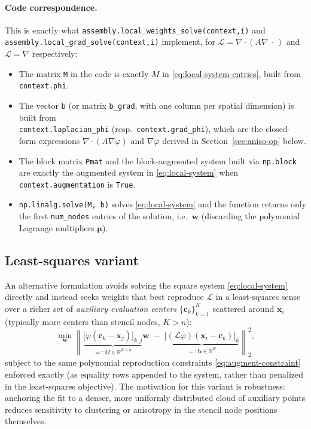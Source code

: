 \documentclass[11pt]{article}
\newcommand{\bx}{\mathbf{x}}
\newcommand{\bw}{\mathbf{w}}
\newcommand{\bc}{\mathbf{c}}
\newcommand{\R}{\mathbb{R}}
\newcommand{\diver}{\nabla\!\cdot}
\newcommand{\grad}{\nabla}
\begin{document}
\paragraph{Code correspondence.}
This is exactly what \texttt{assembly.local\_weights\_solve(context,i)}
and \texttt{assembly.local\_grad\_solve(context,i)} implement, for
$\mathcal{L} = \diver(A\grad\,\cdot\,)$ and $\mathcal{L} = \grad$
respectively:
\begin{itemize}[leftmargin=2em]
  \item The matrix \texttt{M} in the code is exactly $M$ in
        \eqref{eq:local-system-entries}, built from
        \texttt{context.phi}.
  \item The vector \texttt{b} (or matrix \texttt{b\_grad}, with one
        column per spatial dimension) is built from \\
        \texttt{context.laplacian\_phi} (resp.\ \texttt{context.grad\_phi}),
        which are the closed-form expressions $\diver(A\grad\varphi)$
        and $\grad\varphi$ derived in Section~\ref{sec:aniso-op} below.
  \item The block matrix \texttt{Pmat} and the block-augmented system
        built via \texttt{np.block} are exactly the augmented system
        in \eqref{eq:local-system} when \texttt{context.augmentation}
        is \texttt{True}.
  \item \texttt{np.linalg.solve(M, b)} solves \eqref{eq:local-system}
        and the function returns only the first \texttt{num\_nodes}
        entries of the solution, i.e.\ $\bw$ (discarding the
        polynomial Lagrange multipliers $\boldsymbol{\mu}$).
\end{itemize}

\subsection{Least-squares variant}
\label{sec:ls-variant}

An alternative formulation avoids solving the square system
\eqref{eq:local-system} directly and instead seeks weights that best
reproduce $\mathcal{L}$ in a least-squares sense over a richer set of
\emph{auxiliary evaluation centers} $\{\bc_k\}_{k=1}^{K}$ scattered
around $\bx_i$ (typically more centers than stencil nodes, $K > n$):
\begin{equation}
  \min_{\bw}
  \left\|
    \underbrace{\big[\varphi(\bc_k - \bx_j)\big]_{k,j}}_{=:M \in
    \R^{K\times n}} \bw
    \;-\;
    \underbrace{\big[(\mathcal{L}\varphi)(\bx_i - \bc_k)\big]_k}_{=:\mathbf{b}
    \in \R^{K}}
  \right\|_2^2,
  \label{eq:ls-system}
\end{equation}
subject to the same polynomial reproduction constraints
\eqref{eq:augment-constraint} enforced exactly (as equality rows
appended to the system, rather than penalized in the least-squares
objective). The motivation for this variant is robustness: anchoring
the fit to a denser, more uniformly distributed cloud of auxiliary
points reduces sensitivity to clustering or anisotropy in the stencil
node positions themselves.
\end{document}

